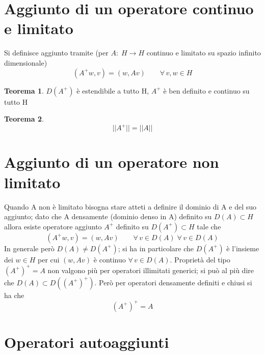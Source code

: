 \documentclass[a4paper,11pt]{report}
\theoremstyle{remark}
\theoremstyle{definition}
\newtheorem*{teo}{Teorema}
\begin{document}
\section{Aggiunto di un operatore continuo e limitato}
Si definisce aggiunto tramite (per $A: \; H \to H$ continuo e limitato su spazio infinito dimensionale)
\begin{equation*}
	(A^+w,v) = (w,Av) \qquad \forall \, v,w \in H
\end{equation*}
\begin{teo}
	$D(A^+)$ è estendibile a tutto H, $A^+$ è ben definito e continuo su tutto H
\end{teo}
\begin{teo}
	\begin{equation*}
		||A^+|| = ||A||
	\end{equation*}
\end{teo}

\section{Aggiunto di un operatore non limitato}
Quando A non è limitato bisogna stare atteti a definire il dominio di A e del suo aggiunto; dato che A densamente (dominio denso in A) definito su $D(A) \subset H$ allora esiste operatore aggiunto $A^+$ definito su $D(A^+)\subset H$ tale che 
\begin{equation*}
	(A^+ w , v) = (w, Av) \qquad \forall \, v \in D(A) \; \forall \, v \in D(A)
\end{equation*}
In generale però $D(A) \neq D(A^+)$; si ha in particolare che $D(A^+)$ è l'insieme dei $w\in H $ per cui $(w,Av)$ è continuo $\forall \, v \in D(A)$. Proprietà del tipo ${(A^+)}^+ = A$ non valgono più per operatori illimitati generici; si può al più dire che $D(A) \subset D({(A^+)}^+)$. Però per operatori densamente definiti e chiusi si ha che 
\begin{equation*}
	{(A^+)}^+ = A
\end{equation*} 

\section{Operatori autoaggiunti}
\end{document}
